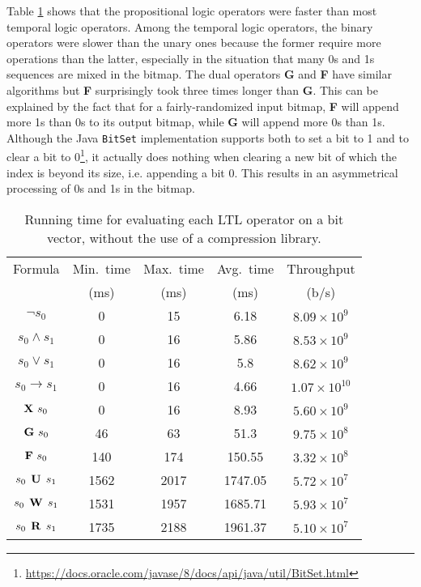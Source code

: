 Table \ref{tbl:bm:basicops} shows that the propositional logic operators were faster than most temporal logic operators. Among the temporal logic operators, the binary operators were slower than the unary ones because the former require more operations than the latter, especially in the situation that many 0s and 1s sequences are mixed in the bitmap. The dual operators \textbf{G} and \textbf{F} have similar algorithms but \textbf{F} surprisingly took three times longer than \textbf{G}. This can be explained by the fact that for a fairly-randomized input bitmap, \textbf{F} will append more 1s than 0s to its output bitmap, while \textbf{G} will append more 0s than 1s. Although the Java \texttt{BitSet} implementation supports both to set a bit to 1 and to clear a bit to 0\footnote{\url{https://docs.oracle.com/javase/8/docs/api/java/util/BitSet.html}}, it actually does nothing when clearing a new bit of which the index is beyond its size, i.e. appending a bit 0. This results in an asymmetrical processing of 0s and 1s in the bitmap.

\begin{table}
\centering
\small
\begin{tabular}{|c|c|c|c|c|}
\hline
Formula & Min.\ time & Max.\ time & Avg.\ time & Throughput \\
& (ms) & (ms) & (ms) & (b/s) \\
\hline
$\neg s_0$ & 0 & 15 & 6.18 & $8.09 \times 10^{9}$ \\
\hline
$s_0 \wedge s_1$ & 0 & 16 & 5.86 & $8.53 \times 10^{9}$ \\
\hline
$s_0 \vee s_1$ & 0 & 16 & 5.8 & $8.62 \times 10^{9}$ \\
\hline
$s_0 \rightarrow s_1$ & 0 & 16 & 4.66 & $1.07 \times 10^{10}$ \\
\hline
$\mathop{\mbox{\textbf{X}}}\, s_0$ & 0 & 16 & 8.93 & $5.60 \times 10^{9}$ \\
\hline
$\mathop{\mbox{\textbf{G}}}\, s_0$ & 46 & 63 & 51.3 & $9.75 \times 10^8$ \\
\hline
$\mathop{\mbox{\textbf{F}}}\, s_0$ & 140 & 174 & 150.55 & $3.32 \times 10^8$ \\
\hline
$s_0 \mathrel{\mbox{\,\textbf{U}}}\, s_1$ & 1562 & 2017 & 1747.05 & $5.72 \times 10^7$ \\
\hline
$s_0 \mathrel{\mbox{\,\textbf{W}}}\, s_1$ & 1531 & 1957 & 1685.71 & $5.93 \times 10^7$ \\
\hline
$s_0 \mathrel{\mbox{\,\textbf{R}}}\, s_1$ & 1735 & 2188 & 1961.37 & $5.10 \times 10^7$ \\
\hline
\end{tabular}
\vskip 8pt
\caption{Running time for evaluating each LTL operator on a bit vector, without the use of a compression library.}
\label{tbl:bm:basicops}
\end{table}

